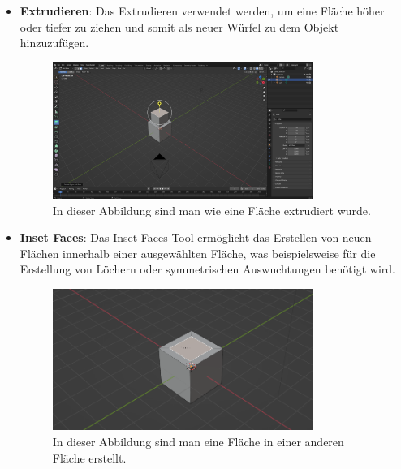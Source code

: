 \begin{itemize}
    \item \textbf{Extrudieren}:
    \indent Das Extrudieren verwendet werden, um eine Fläche höher oder tiefer zu ziehen und somit als neuer Würfel zu dem Objekt hinzuzufügen.
    \begin{figure}[H]
        \centering
        \includegraphics[width=0.8\textwidth]{chapters/13/images/ExtrudeTool.png}
        \caption{In dieser Abbildung sind man wie eine Fläche extrudiert wurde.}
        \label{UST-9}
    \end{figure}
    
    \item \textbf{Inset Faces}:
    \indent Das Inset Faces Tool ermöglicht das Erstellen von neuen Flächen innerhalb einer ausgewählten Fläche, was beispielsweise für die Erstellung von Löchern oder symmetrischen Auswuchtungen benötigt wird.
    \begin{figure}[H]
        \centering
        \includegraphics[width=0.8\textwidth]{chapters/13/images/InsetFace.png}
        \caption{In dieser Abbildung sind man eine Fläche in einer anderen Fläche erstellt.}
        \label{UST-10}
    \end{figure}
    

\end{itemize}
